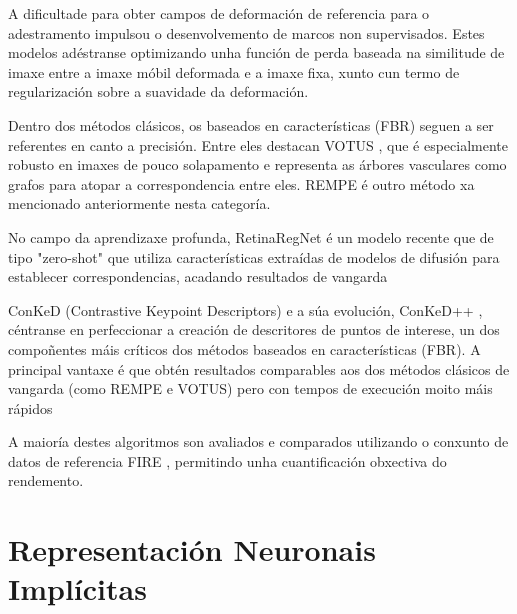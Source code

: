 A dificultade para obter campos de deformación de referencia para o adestramento impulsou o desenvolvemento de marcos non supervisados. Estes modelos adéstranse optimizando unha función de perda baseada na similitude de imaxe entre a imaxe móbil deformada e a imaxe fixa, xunto cun termo de regularización sobre a suavidade da deformación. 


Dentro dos métodos clásicos, os baseados en características (FBR) seguen a ser referentes en canto a precisión. Entre eles destacan VOTUS \cite{Votus}, que é especialmente robusto en imaxes de pouco solapamento e representa as árbores vasculares como grafos para atopar a correspondencia entre eles. REMPE \cite{rempe} é outro método xa mencionado anteriormente nesta categoría.

No campo da aprendizaxe profunda, RetinaRegNet \cite{sivaraman2024retinaregnetzeroshotapproachretinal} é un modelo recente que de tipo "zero-shot" que utiliza características extraídas de modelos de difusión para establecer correspondencias, acadando resultados de vangarda

ConKeD (Contrastive Keypoint Descriptors) e a súa evolución, ConKeD++ , céntranse en perfeccionar a creación de descritores de puntos de interese, un dos compoñentes máis críticos dos métodos baseados en características (FBR).
A principal vantaxe é que obtén resultados comparables aos dos métodos clásicos de vangarda (como REMPE e VOTUS) pero con tempos de execución moito máis rápidos

A maioría destes algoritmos son avaliados e comparados utilizando o conxunto de datos de referencia FIRE \cite{FIRE}, permitindo unha cuantificación obxectiva do rendemento.

\section{Representación Neuronais Implícitas}
\label{sec:Representación Neuronais Implícitas} 


